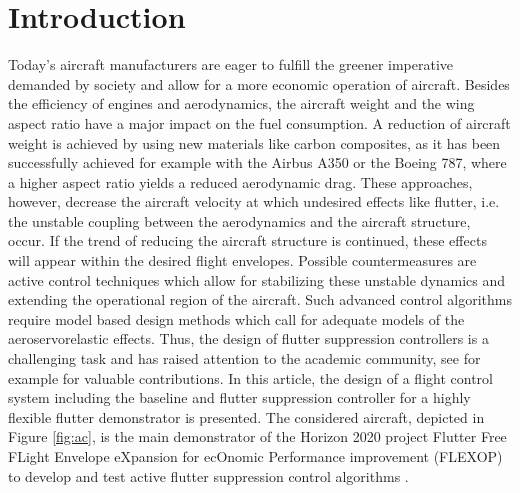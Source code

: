\documentclass[aerospace,article,submit,moreauthors,pdftex,10pt,a4paper]{Definitions/mdpi}
\begin{document}


\section{Introduction}
Today's aircraft manufacturers are eager to fulfill the greener imperative demanded by society and allow for a more economic operation of aircraft. Besides the efficiency of engines and aerodynamics, the aircraft weight and the wing aspect ratio have a major impact on the fuel consumption. A reduction of aircraft weight is achieved by using new materials like carbon composites, as it has been successfully achieved for example with the Airbus A350 or the Boeing 787, where a higher aspect ratio yields a reduced aerodynamic drag. These  approaches, however, decrease the aircraft velocity at which undesired effects like flutter, i.e. the unstable coupling between the aerodynamics and the aircraft structure, occur. If the trend of reducing the aircraft structure is continued, these effects will appear within the desired flight envelopes.  Possible countermeasures are active control techniques which allow for stabilizing these unstable dynamics and extending the operational region of the aircraft. 
Such advanced control algorithms require model based design methods which call for adequate models of the aeroservorelastic effects. Thus, the design of flutter suppression controllers is a challenging task and has raised attention to the academic community, see for example \cite{Theis16,Danowsky17,Danowsky18} for valuable contributions. In this article, the design of a flight control system including the baseline and flutter suppression controller for a highly flexible flutter demonstrator is presented. The considered aircraft, depicted in Figure \ref{fig:ac}, is the main demonstrator of the Horizon 2020 project Flutter Free FLight Envelope eXpansion for ecOnomic Performance improvement (FLEXOP) to develop and test active flutter suppression control algorithms \cite{Stahl17,Roessler19}.
\end{document}
